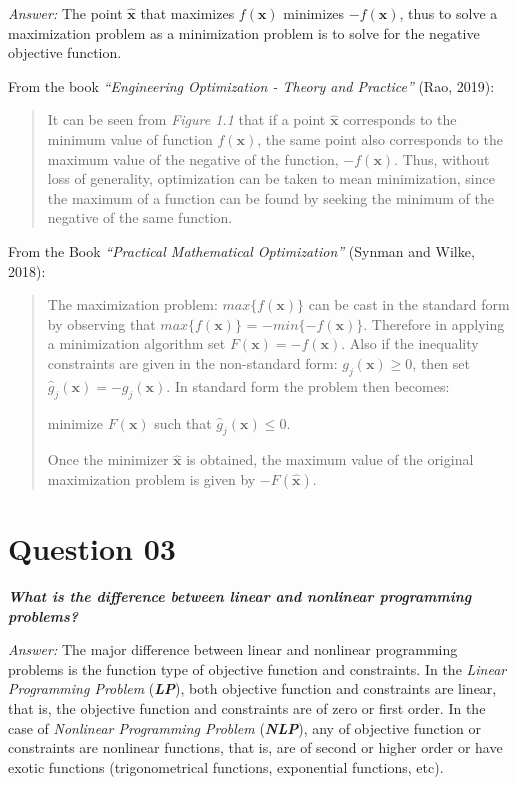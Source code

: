 \documentclass[conference]{IEEEtran}
\begin{document}
\textit{Answer:} The point $\hat{\mathbf{x}}$ that maximizes $f(\mathbf{x})$ minimizes $-f(\mathbf{x})$, thus to solve a maximization problem as a minimization problem is to solve for the negative objective function.

From the book \textit{``Engineering Optimization - Theory and Practice''}  (Rao, 2019):

\begin{quotation}
	It can be seen from \textit{Figure 1.1} that if a point $\hat{\mathbf{x}}$ corresponds to the minimum value of function $f (\mathbf{x})$, the same point also corresponds to the maximum value of the negative of the function, $-f (\mathbf{x})$. Thus, without loss of generality, optimization can be taken to mean minimization, since the maximum of a function can be found by seeking the minimum of the negative of the same function.
\end{quotation}


From the Book \textit{``Practical Mathematical Optimization''} (Synman and Wilke, 2018):

\begin{quotation}
	The maximization problem: $max\{f(\mathbf{x})\}$ can be cast in the standard form by observing that $max\{f(\mathbf{x})\}$ = $-min\{-f(\mathbf{x})\}$. Therefore in applying a minimization algorithm set $F(\mathbf{x}) = -f (\mathbf{x})$. Also if the inequality constraints are given in the non-standard form:	$g_j (\mathbf{x}) \geq 0$, then set $\hat{g}_j (\mathbf{x}) = -g_j (\mathbf{x})$. In standard form the problem then becomes:
	\begin{center}
		minimize $F(\mathbf{x})$ such that $\hat{g}_j (\mathbf{x}) \leq 0$.
	\end{center}

	
	Once the minimizer $\hat{\mathbf{x}}$ is obtained, the maximum value of the original maximization problem is given by $-F(\hat{\mathbf{x}})$.
\end{quotation}

\section{Question 03}

\textbf{\textit{What is the difference between linear and nonlinear	programming problems?}}

\textit{Answer:} The major difference between linear and nonlinear programming problems is the function type of objective function and constraints. In the \textit{Linear Programming Problem} (\textbf{\textit{LP}}), both objective function and constraints are linear, that is, the objective function and constraints are of zero or first order. In the case of \textit{Nonlinear Programming Problem} (\textbf{\textit{NLP}}), any of objective function or constraints are nonlinear functions, that is, are of second or higher order or have exotic functions (trigonometrical functions, exponential functions, etc).
\end{document}
